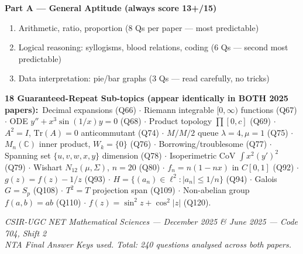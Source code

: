 \documentclass[11pt,a4paper]{article}
\begin{document}
\begin{tcolorbox}
\medskip
\textbf{Part A — General Aptitude (always score 13+/15)}
\begin{enumerate}[leftmargin=1.5em,itemsep=2pt,start=13]
  \item Arithmetic, ratio, proportion (8 Qs per paper --- most predictable)
  \item Logical reasoning: syllogisms, blood relations, coding (6 Qs --- second most predictable)
  \item Data interpretation: pie/bar graphs (3 Qs --- read carefully, no tricks)
\end{enumerate}

\end{tcolorbox}

\vspace{8pt}

\begin{tcolorbox}[enhanced, colback=C9!6, colframe=C9,
  boxrule=0.8pt, arc=5pt, left=10pt, right=10pt, top=6pt, bottom=6pt]
\textbf{\color{C9}18 Guaranteed-Repeat Sub-topics (appear identically in BOTH 2025 papers):}\ 
Decimal expansions (Q66) $\cdot$ Riemann integrable $[0,\infty)$ functions (Q67) $\cdot$
ODE $y''+x^3\sin(1/x)y=0$ (Q68) $\cdot$ Product topology $\prod[0,c]$ (Q69) $\cdot$
$A^2=I$, $\mathrm{Tr}(A)=0$ anticommutant (Q74) $\cdot$ $M/M/2$ queue $\lambda=4,\mu=1$ (Q75) $\cdot$
$M_n(\mathbb{C})$ inner product, $W_k=\{0\}$ (Q76) $\cdot$ Borrowing/troublesome (Q77) $\cdot$
Spanning set $\{u,v,w,x,y\}$ dimension (Q78) $\cdot$ Isoperimetric CoV $\int x^2(y')^2$ (Q79) $\cdot$
Wishart $N_{12}(\mu,\Sigma)$, $n=20$ (Q80) $\cdot$ $f_n=n(1-nx)$ in $C[0,1]$ (Q92) $\cdot$
$g(z)=f(z)-1/z$ (Q93) $\cdot$ $H=\{(a_n)\in\ell^2:|a_n|\le 1/n\}$ (Q94) $\cdot$
Galois $G=S_p$ (Q108) $\cdot$ $T^2=T$ projection span (Q109) $\cdot$
Non-abelian group $f(a,b)=ab$ (Q110) $\cdot$ $f(z)=\sin^2z+\cos^2|z|$ (Q120).
\end{tcolorbox}

\vspace{8pt}

\begin{center}
\small\color{gray!60!black}
\textit{CSIR-UGC NET Mathematical Sciences --- December 2025 \& June 2025 --- Code 704, Shift 2}\\
\textit{NTA Final Answer Keys used. Total: 240 questions analysed across both papers.}
\end{center}
\end{document}
